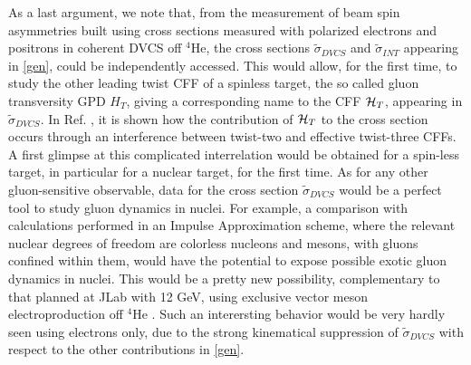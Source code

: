 \documentclass[times, twoside]{PosWhiPap}
\begin{document}
{As a last argument,
we note that, from the measurement of 
beam spin asymmetries built using 
cross sections measured with polarized electrons and positrons
in coherent DVCS off $^4$He, the 
cross sections $\tilde 
\sigma_{DVCS}$
and $\tilde 
\sigma_{INT}$
appearing in \eqref{gen},
could be independently accessed.
This would allow,
for the first time, 
to study the other leading twist CFF of a spinless target,
the so called  gluon transversity GPD $H_T$, giving a corresponding
name to the CFF ${\cal{H}}_T$, appearing in
$\tilde  \sigma_{DVCS}$. In Ref. 
\cite{Belitsky:2008bz}, it is shown how
the contribution of ${\cal{H}}_T$ to the cross section
occurs through an interference between twist-two
and effective twist-three CFFs. A first glimpse at this complicated interrelation
would be obtained for a spin-less target, in particular for a nuclear target,
for the first time.
As for any other gluon-sensitive observable, data for the cross section
$\tilde  \sigma_{DVCS}$ would be a perfect tool to study gluon dynamics in nuclei. For example, a comparison with calculations performed in an Impulse Approximation scheme, where the relevant nuclear degrees of freedom
are colorless nucleons and mesons, with gluons confined within them, would
have the potential to expose possible exotic gluon dynamics in nuclei.
This would be a pretty new possibility, complementary to that planned at JLab
with 12 GeV, using exclusive vector meson electroproduction off
$^4$He \cite{Armstrong:2017zcm}.
Such an interersting behavior would be very hardly seen using electrons only,
due to the strong kinematical suppression of $\tilde  \sigma_{DVCS}$ with respect to
the other contributions in \eqref{gen}.
}
\end{document}

